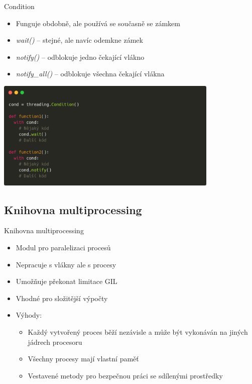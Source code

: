 \documentclass{beamer}
\begin{document}
\begin{frame}[fragile]{Condition}
    \begin{itemize}
        \item Funguje obdobně, ale používá se současně se zámkem

        \vskip 0.25in
        \item \textit{wait()} – stejné, ale navíc odemkne zámek
        \item \textit{notify()} – odblokuje jedno čekající vlákno
        \item \textit{notify\_all()} – odblokuje všechna čekající vlákna
    \end{itemize}
    \scriptsize

    \begin{center}
        \includegraphics[width=0.8\textwidth]{obrazky/codes/carbon6.png}
    \end{center}
\end{frame}

\subsection{Knihovna multiprocessing}
\begin{frame}{Knihovna multiprocessing}
    \begin{itemize}
        \item Modul pro paralelizaci procesů
        \item Nepracuje s vlákny ale s procesy
        \item Umožňuje překonat limitace GIL
        \item Vhodné pro složitější výpočty
        
        \vskip 0.3in
        \item Výhody:
        \begin{itemize}
            \item Každý vytvořený proces běží nezávisle a může být vykonáván na jiných jádrech procesoru
            \item Všechny procesy mají vlastní paměť
            \item Vestavené metody pro bezpečnou práci se sdílenými prostředky
        \end{itemize}
    \end{itemize}
\end{frame}
\end{document}
